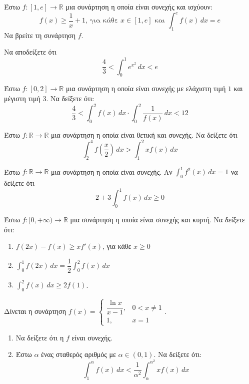\documentclass{presentation}
\begin{document}
\begin{askisi}
  Έστω $f:[1,e]\to \mathbb{R}$ μια συνάρτηση η οποία είναι συνεχής και ισχύουν:
  $$f(x)\ge \frac{1}{x}+1 \text{, για κάθε } x\in [1,e] \text{ και } \int_{1}^{e}f(x)\, dx=e$$
  Να βρείτε τη συνάρτηση $f$.
\end{askisi}

\begin{askisi}
  Να αποδείξετε ότι $$\frac{4}{3}<\int_{0}^{1}e^{x^2}\, dx<e$$
\end{askisi}

\begin{askisi}
  Έστω $f:[0,2]\to \mathbb{R}$ μια συνάρτηση η οποία είναι συνεχής με ελάχιστη τιμή $1$ και μέγιστη τιμή $3$. Να δείξετε ότι:
  $$\frac{4}{3}<\int_{0}^{2}f(x)\, dx\cdot \int_{0}^{2}\frac{1}{f(x)}\, dx<12$$
\end{askisi}

\begin{askisi}
  Έστω $f:\mathbb{R}\to \mathbb{R}$ μια συνάρτηση η οποία είναι θετική και συνεχής. Να δείξετε ότι
  $$\int_{2}^{4}f(\frac{x}{2})\, dx > \int_{1}^{2}xf(x)\, dx$$
\end{askisi}

\begin{askisi}
  Έστω $f:\mathbb{R}\to \mathbb{R}$ μια συνάρτηση η οποία είναι συνεχής. Αν $\int_{0}^{1}f^2(x)\, dx=1$ να δείξετε ότι $$2+3\int_{0}^{1}f(x)\, dx \ge 0$$
\end{askisi}

\begin{askisi}
  Έστω $f:[0, +\infty)\to \mathbb{R}$ μια συνάρτηση η οποία είναι συνεχής και κυρτή. Να δείξετε ότι:
  \begin{enumerate}[<+->]
    \item $f(2x)-f(x)\ge xf'(x)$, για κάθε $x\ge 0$
    \item $\int_{0}^{1}f(2x)\, dx=\dfrac{1}{2}\int_{0}^{2}f(x)\, dx$
    \item $\int_{0}^{2}f(x)\, dx\ge 2f(1)$.
  \end{enumerate}
\end{askisi}

\begin{askisi}
  Δίνεται η συνάρτηση $f(x)=\begin{cases}
      \dfrac{\ln x}{x-1}, & 0<x\ne 1 \\
      1,                  & x=1
    \end{cases}$.
  \begin{enumerate}[<+->]
    \item Να δείξετε ότι η $f$ είναι συνεχής.
    \item Έστω $α$ ένας σταθερός αριθμός με $α\in (0,1)$. Να δείξετε ότι:
          $$\int_{1}^{α}f(x)\, dx<\frac{1}{α^2} \int_{α}^{α^2}xf(x)\, dx$$
  \end{enumerate}
\end{askisi}
\end{document}
